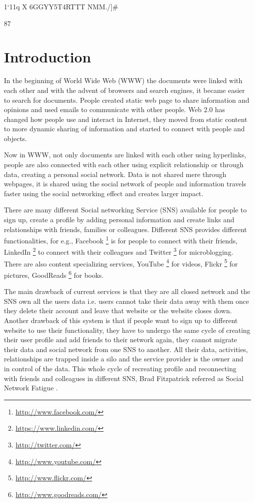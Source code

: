  																																																1`11q	 X 6GGYY5T4RTTT NMM./]#
 																																																
 																																																87%


\chapter{Introduction} \label{Chapter:Introduction}

In the beginning of World Wide Web (WWW) the documents were linked with each other and with the advent of browsers and search engines, it became easier to search for documents. People created static web page to share information and opinions and used emails to communicate with other people. Web 2.0 has changed how people use and interact in Internet, they moved from static content to more dynamic sharing of information and started to connect with people and objects.

Now in WWW, not only documents are linked with each other using hyperlinks, people are also connected with each other using explicit relationship or through data, creating a personal social network. Data is not shared mere through webpages, it is shared using the social network of people and information travels faster using the social networking effect and creates larger impact.

There are many different Social networking Service (SNS) available for people to sign up, create a profile by adding personal information and create links and relationships with friends, families or colleagues. Different SNS provides different functionalities, for e.g., Facebook  \footnote{\url{http://www.facebook.com/}}  is for people to connect with their friends, LinkedIn \footnote{\url{https://www.linkedin.com/}} to connect with their colleagues and Twitter  \footnote{\url{http://twitter.com/}} for microblogging. There are also content specializing services, YouTube \footnote{\url{http://www.youtube.com/}} for videos, Flickr \footnote{\url{http://www.flickr.com/}} for pictures, GoodReads \footnote{\url{http://www.goodreads.com/}} for books.

The main drawback of current services is that they are all closed network and the SNS own all the users data i.e. users cannot take their data away with them once they delete their account and leave that website or the website closes down. Another drawback of this system is that if people want to sign up to different website to use their functionality, they have to undergo the same cycle of creating their user profile and add friends to their network again, they cannot migrate their data and social network from one SNS to another. All their data, activities, relationships are trapped inside a silo and the service provider is the owner and in control of the data. This whole cycle of recreating profile and reconnecting with friends and colleagues in different SNS, Brad Fitzpatrick referred as Social Network Fatigue \cite{fitzpatrick2007}.

